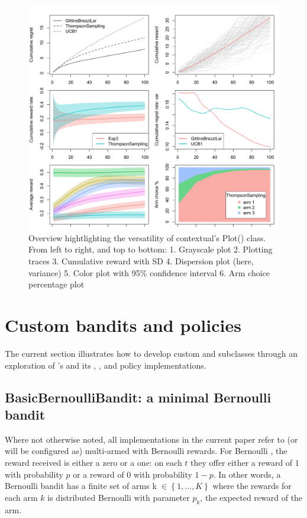 \documentclass{jss}
\begin{document}
\begin{figure}[H]
\centering
\includegraphics[width=.99\textwidth]{fig/section_4_2_plot}
\caption{Overview hightlighting the versatility of contextual's Plot() class. From left to right, and top to bottom: 1. Grayscale plot 2. Plotting traces 3. Cumulative reward with SD 4. Dispersion plot (here, variance) 5. Color plot with 95\% confidence interval 6. Arm choice percentage plot }
\label{fig:section_4_2_plot}
\end{figure}

\section{Custom bandits and policies} \label{extending}

The current section illustrates how to develop custom  and  subclasses through an exploration of 's  and its , , and  policy implementations.

\subsection{BasicBernoulliBandit: a minimal Bernoulli bandit} \label{BasicBernoulliBandit}

Where not otherwise noted, all  implementations in the current paper refer to (or will be configured as) multi-armed  with Bernoulli rewards. For Bernoulli , the reward received is either a zero or a one: on each $t$ they offer either a reward of $1$ with probability $p$ or a reward of $0$ with probability $1 - p$. In other words, a Bernoulli bandit has a finite set of arms k \(  \in \left\{ 1, \dots, K \right\} \) where the rewards for each arm $k$ is distributed Bernoulli with parameter $p_k$, the expected reward of the arm.
\end{document}
